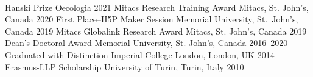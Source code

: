\\

\begin{cvhonors}

  \mycvhonor
    {Hanski Prize} %
    {Oecologia} %
    {2021} %
  \mycvhonor
    {Mitacs Research Training Award} %
    {Mitacs, St. John's, Canada} %
    {2020} %
  \mycvhonor
    {First Place--H5P Maker Session} %
    {Memorial University, St.~John's, Canada} %
    {2019} %
  \mycvhonor
    {Mitacs Globalink Research Award} %
    {Mitacs, St. John's, Canada} %
    {2019} %
  \mycvhonor
    {Dean's Doctoral Award} %
    {Memorial University, St. John's, Canada} %
    {2016--2020} %
  \mycvhonor
    {Graduated with Distinction} %
    {Imperial College London, London, UK} %
    {2014} %
  \mycvhonor
    {Erasmus-LLP Scholarship} %
    {University of Turin, Turin, Italy} %
    {2010} %
\end{cvhonors}